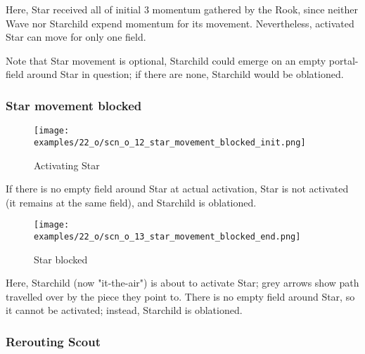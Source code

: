 Here, Star received all of initial 3 momentum gathered by the Rook, since neither
Wave nor Starchild expend momentum for its movement. Nevertheless, activated Star
can move for only one field.

Note that Star movement is optional, Starchild could emerge on an empty portal-field
around Star in question; if there are none, Starchild would be oblationed.

\clearpage %

\subsubsection*{Star movement blocked}
\label{sec:One/Starchild/Movement/Star movement blocked}

\noindent
\begin{wrapfigure}[4]{l}{0.4\textwidth}
\centering
\texttt{[image: examples/22\_o/scn\_o\_12\_star\_movement\_blocked\_init.png]}
\caption{Activating Star}
\label{fig:scn_o_12_star_movement_blocked_init}
\end{wrapfigure}
If there is no empty field around Star at actual activation, Star is not activated
(it remains at the same field), and Starchild is oblationed.

\vspace*{4.1\baselineskip}
\noindent
\begin{wrapfigure}[7]{l}{0.4\textwidth}
\centering
\texttt{[image: examples/22\_o/scn\_o\_13\_star\_movement\_blocked\_end.png]}
\caption{Star blocked}
\label{fig:scn_o_13_star_movement_blocked_end}
\end{wrapfigure}
Here, Starchild (now "it-the-air") is about to activate Star; grey arrows show path
travelled over by the piece they point to. There is no empty field around Star, so it
cannot be activated; instead, Starchild is oblationed.

\subsubsection*{Rerouting Scout}
\label{sec:One/Starchild/Movement/Rerouting Scout}

